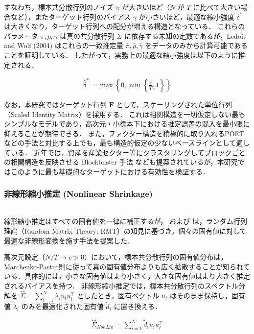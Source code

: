 \documentclass[lualatex,a4paper,11pt]{jlreq}
\begin{document}
すなわち，標本共分散行列のノイズ $\pi$ が大きいほど（$N$ が $T$ に比べて大きい場合など），またターゲット行列のバイアス $\gamma$ が小さいほど，最適な縮小強度 $\delta^*$ は大きくなり，ターゲット行列への配分が増える構造となっている．
これらのパラメータ $\pi, \rho, \gamma$ は真の共分散行列 $\Sigma$ に依存する未知の定数であるが，Ledoit and Wolf (2004) はこれらの一致推定量 $\hat{\pi}, \hat{\rho}, \hat{\gamma}$ をデータのみから計算可能であることを証明している．
したがって，実務上の最適な縮小強度は以下のように推定される．

\begin{align}
    \hat{\delta}^* = \max \left\{ 0, \min \left\{ \frac{\hat{\kappa}}{T}, 1 \right\} \right\}
\end{align}

なお，本研究ではターゲット行列 $\symbf{F}$ として，スケーリングされた単位行列（Scaled Identity Matrix）を採用する．
これは相関構造を一切仮定しない最もシンプルなモデルであり，高次元・小標本下における推定誤差の混入を最小限に抑えることが期待できる．
また，ファクター構造を積極的に取り入れるPOETなどの手法と対比する上でも，最も構造的仮定の少ないベースラインとして適している．
近年では，資産を産業セクター等にクラスタリングしてブロックごとの相関構造を反映させる Blockbuster 手法 \citep{DeNard2022} なども提案されているが，本研究ではこのように最も基礎的なターゲットにおける有効性を検証する．

\subsubsection{非線形縮小推定 (Nonlinear Shrinkage)} \mbox{}\\
線形縮小推定はすべての固有値を一律に補正するが，\citet{LedoitWolf2012, LedoitWolf2015} および \citet{DeNard2022} は，ランダム行列理論（Random Matrix Theory: RMT）の知見に基づき，個々の固有値に対して最適な非線形変換を施す手法を提案した．

高次元設定（$N/T \to c > 0$）において，標本共分散行列の固有値分布は，Marchenko-Pastur則に従って真の固有値分布よりも広く拡散することが知られている．具体的には，小さな固有値はより小さく，大きな固有値はより大きく推定されるバイアスを持つ．
非線形縮小推定では，標本共分散行列のスペクトル分解を $\hat{\Sigma} = \sum_{i=1}^{N} \lambda_i u_i u_i^\top$ としたとき，固有ベクトル $u_i$ はそのまま保持し，固有値 $\lambda_i$ のみを最適化された固有値 $\tilde{d}_i$ に置き換える．

\begin{align}
    \hat{\Sigma}_{NonLin} = \sum_{i=1}^{N} \tilde{d}_i u_i u_i^\top
\end{align}
\end{document}
